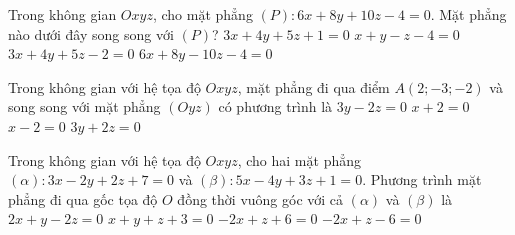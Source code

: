 \begin{ex}%
	Trong không gian $Oxyz$, cho mặt phẳng $(P)\colon 6x + 8y + 10z - 4  = 0$. Mặt phẳng nào dưới đây song song với $(P)$?
	 \choice
		{\True $3x + 4y + 5z +  1 = 0$}
		{$x + y - z - 4 =  0$}
		 {$3x + 4y + 5z - 2 = 0$}
		 {$6x + 8y - 10z - 4 = 0$}
\end{ex}

\begin{ex}%
	Trong không gian với  hệ tọa độ $Oxyz$, mặt phẳng đi qua điểm $A(2;-3;-2)$ và song song với mặt phẳng $(Oyz)$ có phương trình là
	 \choice
		{$3y - 2z  = 0$}
		 {$x + 2 = 0$}
		{\True $x - 2  = 0$}
		 {$3y + 2z = 0$}
\end{ex}

\begin{ex}%
	Trong không gian với hệ tọa độ $Oxyz$, cho hai mặt phẳng $(\alpha)\colon 3x - 2y + 2z + 7 = 0$ và $(\beta)\colon 5x - 4y + 3z + 1 = 0$. Phương trình mặt phẳng đi qua gốc tọa độ $O$ đồng  thời vuông góc với cả $(\alpha)$ và $(\beta)$ là
	 \choice
		{\True $2x + y -  2z = 0$}
		{$x +  y + z + 3 = 0$}
		{$-2x + z  + 6 = 0$}
		{$-2x + z  - 6 = 0$}
\end{ex}

